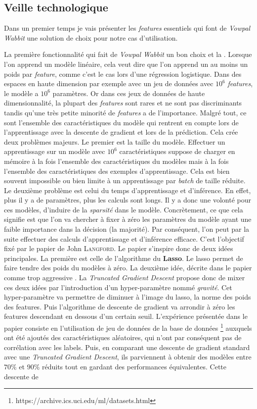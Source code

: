     \subsection{Veille technologique}
        Dans un premier temps je vais présenter les \emph{features} essentiels qui font de \emph{Vowpal Wabbit} une solution de choix pour notre cas d'utilisation. \par
        La première fonctionnalité qui fait de \emph{Vowpal Wabbit} un bon choix et la  \cite{langford2009sparse}. Lorsque l'on apprend un modèle linéaire, cela veut dire que l'on apprend un au moins un poids par \emph{feature}, comme c'est le cas lors d'une régression logistique. Dans des espaces en haute dimension par exemple avec un jeu de données avec $10^6$ \emph{features}, le modèle a $10^6$ paramètres. Or dans ces jeux de données de haute dimensionnalité, la plupart des \emph{features} sont rares et ne sont pas discriminants tandis qu'une très petite minorité de \emph{features} a de l'importance. Malgré tout, ce sont l'ensemble des caractéristiques du modèle qui rentrent en compte lors de l'apprentissage avec la descente de gradient et lors de la prédiction. Cela crée deux problèmes majeurs. Le premier est la taille du modèle. Effectuer un apprentissage sur un modèle avec $10^6$ caractéristiques suppose de charger en mémoire à la fois l'ensemble des caractéristiques du modèles mais à la fois l'ensemble des caractéristiques des exemples d'apprentissage. Cela est bien souvent impossible ou bien limite à un apprentissage par \emph{batch} de taille réduite. Le deuxième problème est celui du temps d'apprentissage et d'inférence. En effet, plus il y a de paramètres, plus les calculs sont longs. Il y a donc une volonté pour ces modèles, d'induire de la \emph{sparsité} dans le modèle. Concrètement, ce que cela signifie est que l'on va chercher à fixer à zéro les paramètres du modèle ayant une faible importance dans la décision (la majorité). Par conséquent, l'on peut par la suite effectuer des calculs d'apprentissage et d'inférence efficace. C'est l'objectif fixé par le papier de John \textsc{Langford}. Le papier s'inspire donc de deux idées principales. La première est celle de l'algorithme du \textbf{Lasso}. Le lasso permet de faire tendre des poids du modèles à zéro. La deuxième idée, décrite dans le papier comme trop \fg aggressive \og. La \emph{Truncated Gradient Descent} propose donc de mixer ces deux idées par l'introduction d'un hyper-paramètre nommé \emph{gravité}. Cet hyper-paramètre va permettre de diminuer à l'image du lasso, la norme des poids des features. Puis l'algorithme de descente de gradient va arrondir à zéro les features descendant en dessous d'un certain seuil. L'expérience présentée dans le papier consiste en l'utilisation de jeu de données de la base de données  \footnote{https://archive.ics.uci.edu/ml/datasets.html} auxquels ont été ajoutés des caractéristiques aléatoires, qui n'ont par conséquent pas de corrélation avec les labels. Puis, en comparant une descente de gradient standard avec une \emph{Truncated Gradient Descent}, ils parviennent à obtenir des modèles entre $70\%$ et $90\%$ réduits tout en gardant des performances équivalentes. Cette descente de 